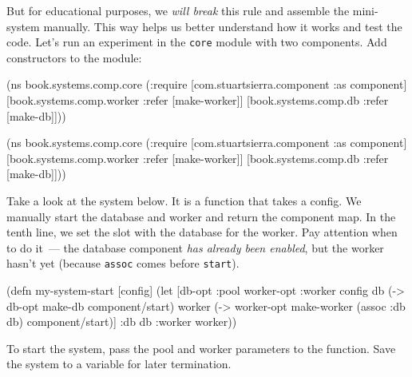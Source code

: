 But for educational purposes, we \emph{will break} this rule and assemble the mini-system manually. This way helps us better understand how it works and test the code. Let's run an experiment in the \verb|core| module with two components. Add constructors to the module:

\ifnarrow

\begin{english}
  \begin{clojure}
(ns book.systems.comp.core
  (:require
   [com.stuartsierra.component
    :as component]
   [book.systems.comp.worker
    :refer [make-worker]]
   [book.systems.comp.db
    :refer [make-db]]))
  \end{clojure}
\end{english}

\else

\begin{english}
  \begin{clojure}
(ns book.systems.comp.core
  (:require
   [com.stuartsierra.component :as component]
   [book.systems.comp.worker :refer [make-worker]]
   [book.systems.comp.db :refer [make-db]]))
  \end{clojure}
\end{english}

\fi

Take a look at the system below. It is a function that takes a config. We manually start the database and worker and return the component map. In the tenth line, we set the slot with the database for the worker.
Pay attention when to do it~--- the database component \emph{has already been enabled}, but the worker hasn't yet (because \verb|assoc| comes before \verb|start|).

\begin{english}
  \begin{clojure/lines}
(defn my-system-start
  [config]
  (let [{db-opt :pool
         worker-opt :worker} config
        db (-> db-opt
               make-db
               component/start)
        worker (-> worker-opt
                   make-worker
                   (assoc :db db)
                   component/start)]
    {:db db :worker worker}))
  \end{clojure/lines}
\end{english}

To start the system, pass the pool and worker parameters to the function. Save the system to a variable for later termination.

\ifnarrow

